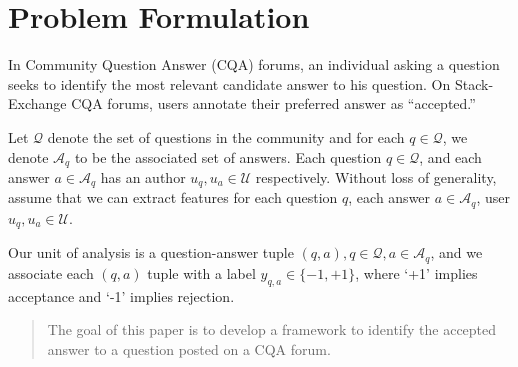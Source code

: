 \section{Problem Formulation}
\label{sec:problem}
In Community Question Answer (CQA) forums, an individual asking a question seeks to identify the most relevant candidate answer to his question. On Stack-Exchange CQA forums, users annotate their preferred answer as ``accepted.''

Let $\mathcal{Q}$ denote the set of questions in the community and for each $q \in \mathcal{Q}$, we denote $\mathcal{A}_q$ to be the associated set of answers. Each question $q \in \mathcal{Q}$, and each answer $a \in \mathcal{A}_q$ has an author $u_q, u_a \in \mathcal{U}$ respectively. Without loss of generality, assume that we can extract features for each question $q$, each answer $a \in \mathcal{A}_q$, user $u_q, u_a \in \mathcal{U}$.

Our unit of analysis is a question-answer tuple $(q,a), q \in \mathcal{Q}, a \in \mathcal{A}_q$, and we associate each $(q,a)$ tuple with a label $y_{q,a} \in \{-1,+1\}$, where `+1' implies acceptance and `-1' implies rejection.

\begin{quote}
    The goal of this paper is to develop a framework to identify the accepted answer to a question posted on a CQA forum.
\end{quote}
